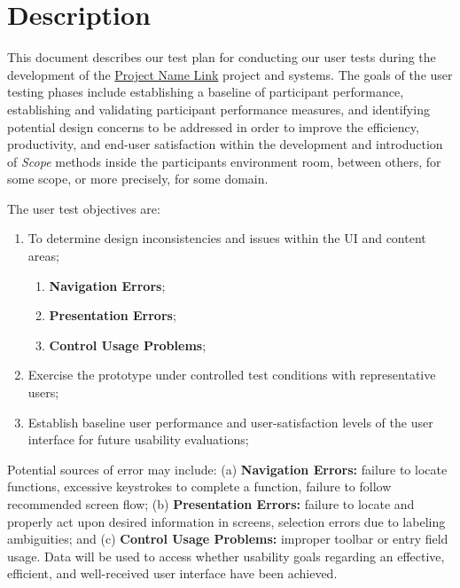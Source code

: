 
\section{Description}
\label{sec:sec002}

This document describes our test plan for conducting our user tests during the development of the \hyperlink{}{Project Name Link} project and systems. The goals of the user testing phases include establishing a baseline of participant performance, establishing and validating participant performance measures, and identifying potential design concerns to be addressed in order to improve the efficiency, productivity, and end-user satisfaction within the development and introduction of \textit{Scope} methods inside the participants environment room, between others, for some scope, or more precisely, for some domain.


\hfill

The user test objectives are:

\begin{enumerate}
\item To determine design inconsistencies and issues within the UI and content areas;
\begin{enumerate}
\item \textbf{Navigation Errors};
\item \textbf{Presentation Errors};
\item \textbf{Control Usage Problems};
\end{enumerate}
\item Exercise the prototype under controlled test conditions with representative users;
\item Establish baseline user performance and user-satisfaction levels of the user interface for future usability evaluations;
\end{enumerate}


Potential sources of error may include: (a) \textbf{Navigation Errors:} failure to locate functions, excessive keystrokes to complete a function, failure to follow recommended screen flow; (b) \textbf{Presentation Errors:} failure to locate and properly act upon desired information in screens, selection errors due to labeling ambiguities; and (c) \textbf{Control Usage Problems:} improper toolbar or entry field usage. Data will be used to access whether usability goals regarding an effective, efficient, and well-received user interface have been achieved.